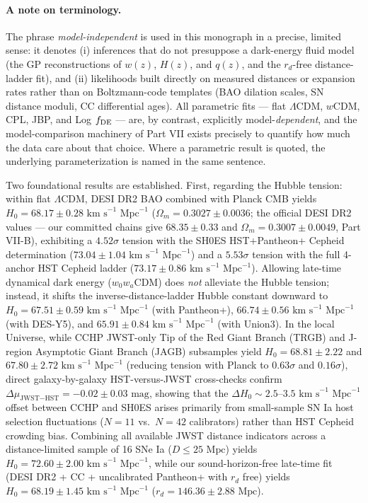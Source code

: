 \documentclass[11pt,letterpaper]{article}
\begin{document}
{\paragraph{A note on terminology.} The phrase \emph{model-independent} is used in this monograph in a precise, limited sense: it denotes (i) inferences that do not presuppose a dark-energy fluid model (the GP reconstructions of $w(z)$, $H(z)$, and $q(z)$, and the $r_d$-free distance-ladder fit), and (ii) likelihoods built directly on measured distances or expansion rates rather than on Boltzmann-code templates (BAO dilation scales, SN distance moduli, CC differential ages). All parametric fits --- flat $\Lambda$CDM, $w$CDM, CPL, JBP, and Log $f_{\rm DE}$ --- are, by contrast, explicitly model-\emph{dependent}, and the model-comparison machinery of Part VII exists precisely to quantify how much the data care about that choice. Where a parametric result is quoted, the underlying parameterization is named in the same sentence.

Two foundational results are established. First, regarding the Hubble tension: within flat $\Lambda$CDM, DESI DR2 BAO combined with Planck CMB yields $H_0 = 68.17 \pm 0.28\text{ km s}^{-1}\text{ Mpc}^{-1}$ ($\Omega_m = 0.3027 \pm 0.0036$; the official DESI DR2 values --- our committed chains give $68.35 \pm 0.33$ and $\Omega_m = 0.3007 \pm 0.0049$, Part VII-B), exhibiting a $4.52\sigma$ tension with the SH0ES HST+Pantheon+ Cepheid determination ($73.04 \pm 1.04\text{ km s}^{-1}\text{ Mpc}^{-1}$) and a $5.53\sigma$ tension with the full 4-anchor HST Cepheid ladder ($73.17 \pm 0.86\text{ km s}^{-1}\text{ Mpc}^{-1}$). Allowing late-time dynamical dark energy ($w_0 w_a$CDM) does \emph{not} alleviate the Hubble tension; instead, it shifts the inverse-distance-ladder Hubble constant downward to $H_0 = 67.51 \pm 0.59\text{ km s}^{-1}\text{ Mpc}^{-1}$ (with Pantheon+), $66.74 \pm 0.56\text{ km s}^{-1}\text{ Mpc}^{-1}$ (with DES-Y5), and $65.91 \pm 0.84\text{ km s}^{-1}\text{ Mpc}^{-1}$ (with Union3). In the local Universe, while CCHP JWST-only Tip of the Red Giant Branch (TRGB) and J-region Asymptotic Giant Branch (JAGB) subsamples yield $H_0 = 68.81 \pm 2.22$ and $67.80 \pm 2.72\text{ km s}^{-1}\text{ Mpc}^{-1}$ (reducing tension with Planck to $0.63\sigma$ and $0.16\sigma$), direct galaxy-by-galaxy HST-versus-JWST cross-checks confirm $\Delta\mu_{\text{JWST}-\text{HST}} = -0.02 \pm 0.03\text{ mag}$, showing that the $\Delta H_0 \sim 2.5\text{--}3.5\text{ km s}^{-1}\text{ Mpc}^{-1}$ offset between CCHP and SH0ES arises primarily from small-sample SN Ia host selection fluctuations ($N=11$ vs.\ $N=42$ calibrators) rather than HST Cepheid crowding bias. Combining all available JWST distance indicators across a distance-limited sample of 16 SNe Ia ($D \le 25\text{ Mpc}$) yields $H_0 = 72.60 \pm 2.00\text{ km s}^{-1}\text{ Mpc}^{-1}$, while our sound-horizon-free late-time fit (DESI DR2 + CC + uncalibrated Pantheon+ with $r_d$ free) yields $H_0 = 68.19 \pm 1.45\text{ km s}^{-1}\text{ Mpc}^{-1}$ ($r_d = 146.36 \pm 2.88\text{ Mpc}$).

}
\end{document}
